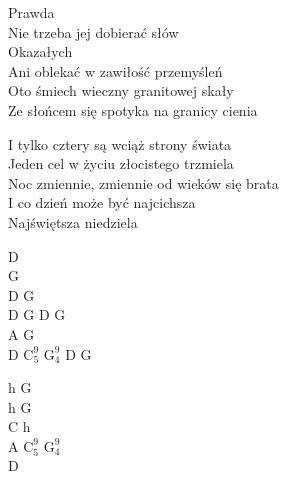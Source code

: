 \begin{text}
Prawda\\
Nie trzeba jej dobierać słów\\
Okazałych\\
Ani oblekać w zawiłość przemyśleń\\
Oto śmiech wieczny granitowej skały\\
Ze słońcem się spotyka na granicy cienia

I tylko cztery są wciąż strony świata\\
Jeden cel w życiu złocistego trzmiela\\
Noc zmiennie, zmiennie od wieków się brata\\
I co dzień może być najcichsza\\
Najświętsza niedziela
\end{text}
\begin{chord}
    D\\
    G\\
    D G\\
    D G D G\\
    A G\\
    D $\mathrm{C_5^9}$ $\mathrm{G_4^9}$ D G

    h G\\
    h G\\
    C h\\
    A $\mathrm{C_5^9}$ $\mathrm{G_4^9}$\\
    D
\end{chord}
